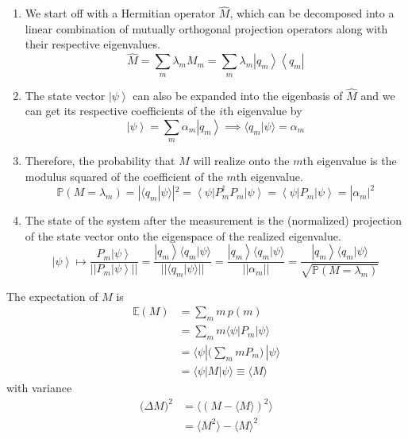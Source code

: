 \documentclass{article}
\newcommand{\ket}[1]{\ensuremath{\left|#1\right\rangle}}
\newcommand{\bra}[1]{\ensuremath{\left\langle#1\right|}}
\newcommand{\braket}[2]{\langle #1 | #2 \rangle}
\begin{document}
      \begin{enumerate} 
        \item We start off with a Hermitian operator $\hat{M}$, which can be decomposed into a linear combination of mutually orthogonal projection operators along with their respective eigenvalues. 
          \begin{equation} 
            \hat{M} = \sum_m \lambda_m M_m = \sum_{m} \lambda_m \ket{q_m} \bra{q_m}
          \end{equation}

        \item The state vector $\ket{\psi}$ can also be expanded into the eigenbasis of $\hat{M}$ and we can get its respective coefficients of the $i$th eigenvalue by 
          \begin{equation} 
            \ket{\psi} = \sum_{m} \alpha_m \ket{q_m} \implies \braket{q_m}{\psi} = \alpha_m
          \end{equation}

        \item Therefore, the probability that $M$ will realize onto the $m$th eigenvalue is the modulus squared of the coefficient of the $m$th eigenvalue. 
          \begin{equation} 
            \mathbb{P}(M = \lambda_m) = |\braket{q_m}{\psi}|^2 = \bra{\psi} P_m^\dagger P_m \ket{\psi} = \bra{\psi} P_m \ket{\psi} = |\alpha_m|^2
          \end{equation}

        \item The state of the system after the measurement is the (normalized) projection of the state vector onto the eigenspace of the realized eigenvalue. 
          \begin{equation} 
            \ket{\psi} \mapsto \frac{P_m \ket{\psi}}{||P_m \ket{\psi}||} = \frac{\ket{q_m} \braket{q_m}{\psi}}{||\braket{q_m}{\psi}||} = \frac{\ket{q_m} \braket{q_m}{\psi}}{||\alpha_m||} = \frac{\ket{q_m} \braket{q_m}{\psi}}{\sqrt{\mathbb{P}(M = \lambda_m)}}
          \end{equation}
      \end{enumerate}

      \begin{definition}
        The expectation of $M$ is
        \begin{align*}
          \mathbb{E}(M) & = \sum_m m\, p(m) \\
          & = \sum_m m \langle \psi | P_m | \psi \rangle \\
          & = \langle \psi | \bigg( \sum_m m P_m \bigg) \, | \psi \rangle \\
          & = \langle \psi | M | \psi \rangle \equiv \langle M \rangle
        \end{align*}
        with variance
        \begin{align*}
          \big( \Delta M\big)^2 & = \langle (M - \langle M \rangle )^2 \rangle \\
          & = \langle M^2 \rangle - \langle M \rangle^2
        \end{align*} 
      \end{definition}
\end{document}
